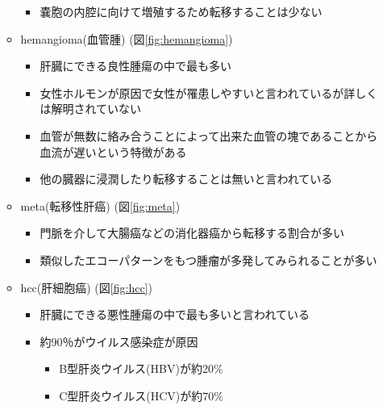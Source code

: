 \documentclass[a4j]{ujarticle}
\newcommand{\Fref}[1]{\mbox{図\ref{fig:#1}}}
\begin{document}
\begin{itemize}
\begin{itemize}
\begin{itemize}
                    \item 嚢胞の内腔に向けて増殖するため転移することは少ない
                \end{itemize}
                \item hemangioma(血管腫) (\Fref{hemangioma})
                \begin{itemize}
                    \item 肝臓にできる良性腫瘍の中で最も多い
                    \item 女性ホルモンが原因で女性が罹患しやすいと言われているが詳しくは解明されていない
                    \item 血管が無数に絡み合うことによって出来た血管の塊であることから血流が遅いという特徴がある
                    \item 他の臓器に浸潤したり転移することは無いと言われている
                \end{itemize}
                \item meta(転移性肝癌) (\Fref{meta})
                \begin{itemize}
                    \item 門脈を介して大腸癌などの消化器癌から転移する割合が多い
                    \item 類似したエコーパターンをもつ腫瘤が多発してみられることが多い
                \end{itemize}
                \item hcc(肝細胞癌) (\Fref{hcc})
                \begin{itemize}
                    \item 肝臓にできる悪性腫瘍の中で最も多いと言われている
                    \item 約90％がウイルス感染症が原因
                    \begin{itemize}
                        \item B型肝炎ウイルス(HBV)が約20\%
                        \item C型肝炎ウイルス(HCV)が約70\%
                    \end{itemize}
                \end{itemize}
            \end{itemize}
        \end{itemize}
\end{document}
